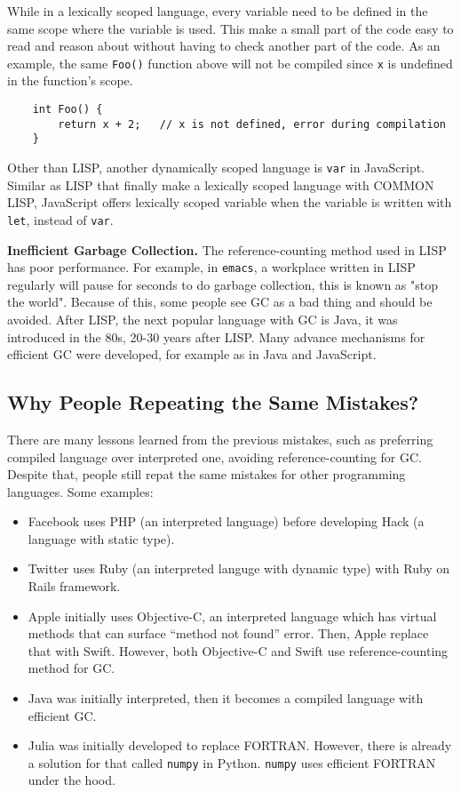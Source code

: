 \documentclass[twoside]{article}
\begin{document}
While in a lexically scoped language, every variable need to be defined in the same scope where the variable is used. This make a small part of the code easy to read and reason about without having to check another part of the code. As an example, the same \verb|Foo()| function above will not be compiled since \verb|x| is undefined in the function's scope.
\begin{verbatim}
    int Foo() {
        return x + 2;   // x is not defined, error during compilation
    }
\end{verbatim}

Other than LISP, another dynamically scoped language is \verb|var| in JavaScript. Similar as LISP that finally make a lexically scoped language with COMMON LISP, JavaScript offers lexically scoped variable when the variable is written with \verb|let|, instead of \verb|var|.

\textbf{Inefficient Garbage Collection. } The reference-counting method used in LISP has poor performance. For example, in \verb|emacs|, a workplace written in LISP regularly will pause for seconds to do garbage collection, this is known as "stop the world". Because of this, some people see GC as a bad thing and should be avoided. After LISP, the next popular language with GC is Java, it was introduced in the 80s, 20-30 years after LISP. Many advance mechanisms for efficient GC were developed, for example as in Java and JavaScript.

\subsection{Why People Repeating the Same Mistakes?}

There are many lessons learned from the previous mistakes, such as preferring compiled language over interpreted one, avoiding reference-counting for GC. Despite that, people still repat the same mistakes for other programming languages. Some examples:
\begin{itemize}
    \item Facebook uses PHP (an interpreted language) before developing Hack (a language with static type).
    \item Twitter uses Ruby (an interpreted languge with dynamic type) with Ruby on Rails framework.
    \item Apple initially uses Objective-C, an interpreted language which has virtual methods that can surface “method not found” error. Then, Apple replace that with Swift. However, both Objective-C and Swift use reference-counting method for GC.
    \item Java was initially interpreted, then it becomes a compiled language with efficient GC.
    \item Julia was initially developed to replace FORTRAN. However, there is already a solution for that called \verb|numpy| in Python. \verb|numpy| uses efficient FORTRAN under the hood.
\end{itemize}
\end{document}
